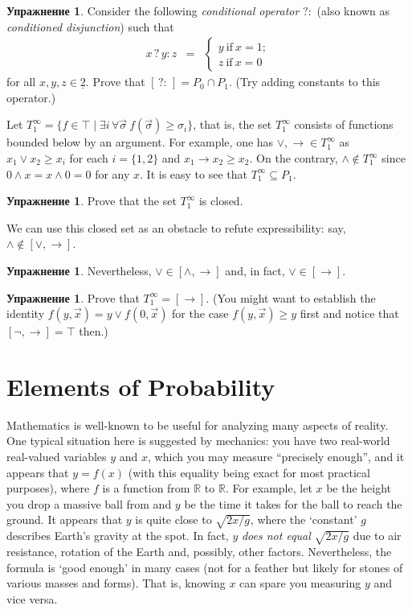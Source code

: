 \documentclass[12pt,notitlepage]{article}
\theoremstyle{plain}
\theoremstyle{definition}
\newtheorem{exc}[thm]{Упражнение}
\theoremstyle{plain}
\newcommand{\R}{\mathbb{R}}
\newcommand{\sbs}{\subseteq}
\newcommand{\ul}[1]{\underline{#1}}
\newcommand{\1}{\mathbf{1}}
\newcommand{\0}{\mathbf{0}}
\begin{document}
\begin{exc} Consider the following \emph{conditional operator} ${?}{:}$ (also known as \emph{conditioned disjunction}) such that 
	$$\begin{array}{rcl}
		x\mathrel{?}y\mathrel{:}z &=& \begin{cases}
			y\ \mbox{if}\ x = 1;\\
			z\ \mbox{if}\ x = 0
		\end{cases}
	\end{array}$$
	for all $x,y,z \in \ul{2}$.
	Prove that  $[\,{?}{:}\,] = P_0 \cap P_1$. (Try adding constants to this operator.)
\end{exc}

Let $T^\infty_1 = \{ f\in \top \mid \exists i\, \forall \vec \sigma\ f(\vec \sigma) \geq \sigma_i \}$, that is, the set $T^\infty_1$ consists of functions bounded below by an argument. For example, one has ${\vee}, {\to} \in T^\infty_1$ as $x_1 \vee x_2 \geq x_i$ for each $i = \{1, 2\}$ and $x_1 \to x_2 \geq x_2$. On the contrary, ${\wedge} \notin T^\infty_1$ since $0 \wedge x = x \wedge 0 = 0$ for any $x$. It is easy to see that $T^\infty_1 \sbs P_1$.

\begin{exc}
	Prove that the set $T^\infty_1$ is closed.
\end{exc}

\noindent We can use this closed set as an obstacle to refute expressibility: say, $\wedge \notin [{\vee}, {\to}]$.
\begin{exc}
	Nevertheless, $\vee \in [{\wedge}, {\to}]$ and, in fact, $\vee \in [{\to}]$.
\end{exc}
\begin{exc}
	Prove that $T^\infty_1 = [\to]$. (You might want to establish the identity $f(y, \vec x) = y \vee f(0, \vec x)$ for the case $f(y,\vec x) \geq y$ first and notice that $[{\neg}, {\to}] = \top$ then.)
\end{exc}

\section{Elements of Probability}

Mathematics is well-known to be useful for analyzing many aspects of reality. One typical situation here is suggested by mechanics: you have two real-world real-valued variables $y$ and $x$, which you may measure ``precisely enough'', and it appears that $y = f(x)$ (with this equality being exact for most practical purposes), where $f$ is a function from $\R$ to $\R$. For example, let $x$ be the height you drop a massive ball from and $y$ be the time it takes for the ball to reach the ground. It appears that $y$ is quite close to $\sqrt{2x/g}$, where the `constant' $g$ describes Earth's gravity at the spot. In fact, $y$ \emph{does not equal} $\sqrt{2x/g}$ due to air resistance, rotation of the Earth and, possibly, other factors. Nevertheless, the formula is `good enough' in many cases (not for a feather but likely for stones of various masses and forms). That is, knowing $x$ can spare you measuring $y$ and vice versa.
\end{document}
